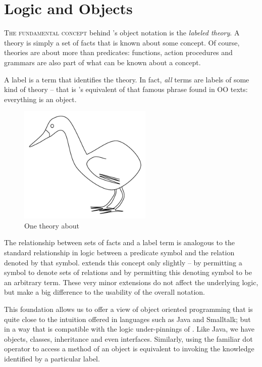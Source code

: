 \chapter{Logic and Objects}
\label{lo}
\lettrine[nindent=0.1em]{T}{he fundamental concept} behind \go's object notation is the \emph{labeled theory}. A theory is simply a set of facts that is known about some concept. Of course, \go theories are about more than predicates: functions, action procedures and grammars are also part of what can be known about a concept.

A label is a term that identifies the theory. In fact, \emph{all} terms are labels of some kind of theory -- that is \go's equivalent of that famous phrase found in OO texts: everything is an object.

\begin{figure}
\centering
\includegraphics[width=2.5in]{bird}
\caption{\label{lo:bird:class}One theory about }
\end{figure}

The relationship between sets of facts and a label term is analogous to the standard relationship in logic between a predicate symbol and the relation denoted by that symbol. \LO extends this concept only slightly -- by permitting a symbol to denote sets of relations and by permitting this denoting symbol to be an arbitrary term. These very minor extensions do not affect the underlying logic, but make a big difference to the usability of the overall notation.

This foundation allows us to offer a view of object oriented programming that is quite close to the intuition offered in languages such as Java and Smalltalk; but in a way that is compatible with the logic under-pinnings of \go. Like Java, we have objects, classes, inheritance and even interfaces. Similarly, using the familiar dot operator to access a method of an object is equivalent to invoking the knowledge identified by a particular label.

